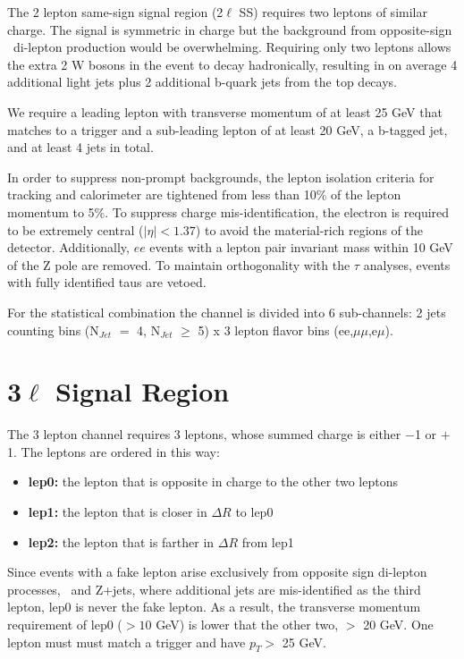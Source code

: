 The 2 lepton same-sign signal region (2$\ell$ SS) requires two leptons of similar charge. The signal is symmetric in charge but
the background from opposite-sign \ttbar\ di-lepton production would be overwhelming. Requiring
only two leptons allows the extra 2 W bosons in the event to decay hadronically, resulting in on average 4 additional
light jets plus 2 additional b-quark jets from the top decays. 

We require a leading lepton with transverse momentum of at least 25 GeV that matches to a
trigger and a sub-leading lepton of at least 20 GeV, a b-tagged jet, and at least 4 jets in
total.  

In order to suppress non-prompt backgrounds, the lepton isolation criteria for tracking and 
calorimeter are tightened from less than 10\% of the lepton momentum to 5\%. To suppress
charge mis-identification, the electron is required to be extremely central ($|\eta| < 1.37$) 
to avoid the material-rich regions of the detector. Additionally, $ee$ events with a 
lepton pair invariant mass within 10 GeV of the Z pole are removed. To maintain orthogonality with the $\tau$ analyses, events with fully identified
taus are vetoed.

For the statistical combination the channel is divided into 6 sub-channels:
2 jets counting bins (N$_{Jet}$ $=$ 4, N$_{Jet}$ $\geq$ 5) x 3 lepton flavor bins (ee,$\mu\mu$,e$\mu$). 


\section{3$\ell$ Signal Region}

The 3 lepton channel requires 3 leptons, whose summed charge is either
$-$1 or $+$1. The leptons are ordered in this way:

\begin{itemize}
\item \textbf{lep0:} the lepton that is opposite in charge to the other two leptons
\item \textbf{lep1:} the lepton that is closer in $\Delta R$ to lep0
\item \textbf{lep2:} the lepton that is farther in $\Delta R$ from lep1
\end{itemize}

Since events with a fake lepton arise exclusively from opposite sign di-lepton processes, \ttbar\ and Z+jets, where additional jets are 
mis-identified as the third lepton, lep0 is never the fake lepton. As a result, the transverse momentum 
requirement of lep0 ($> 10$ GeV) is lower that the other two, $>$ 20 GeV.  One lepton must
must match a trigger and have $p_T >$ 25 GeV. 

